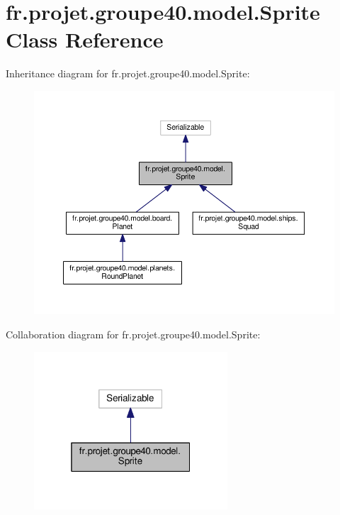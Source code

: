 \hypertarget{classfr_1_1projet_1_1groupe40_1_1model_1_1_sprite}{}\section{fr.\+projet.\+groupe40.\+model.\+Sprite Class Reference}
\label{classfr_1_1projet_1_1groupe40_1_1model_1_1_sprite}


Inheritance diagram for fr.\+projet.\+groupe40.\+model.\+Sprite\+:\nopagebreak
\begin{figure}[H]
\begin{center}
\leavevmode
\includegraphics[width=350pt]{classfr_1_1projet_1_1groupe40_1_1model_1_1_sprite__inherit__graph}
\end{center}
\end{figure}


Collaboration diagram for fr.\+projet.\+groupe40.\+model.\+Sprite\+:\nopagebreak
\begin{figure}[H]
\begin{center}
\leavevmode
\includegraphics[width=205pt]{classfr_1_1projet_1_1groupe40_1_1model_1_1_sprite__coll__graph}
\end{center}
\end{figure}
